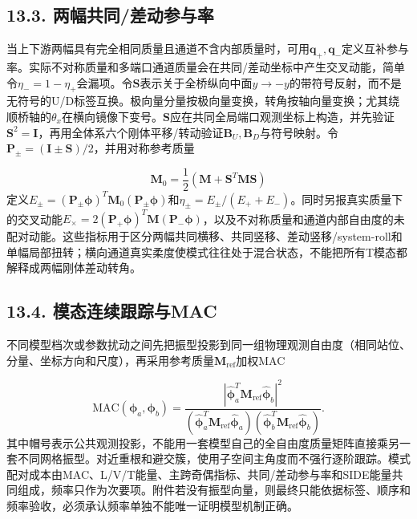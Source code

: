 \documentclass[UTF8,a4paper,11pt,fontset=none]{ctexart}
\begin{document}
\subsection*{13.3. 两幅共同/差动参与率}
当上下游两幅具有完全相同质量且通道不含内部质量时，可用\(\mathbf q_+,\allowbreak \mathbf q_-\)\allowbreak{}定义互补参与率。实际不对称质量和多端口通道质量会在共同/差动坐标中产生交叉动能，简单令\(\eta_-=1-\eta_+\)\allowbreak{}会漏项。令\(\mathbf S\)\allowbreak{}表示关于全桥纵向中面\(y\to-y\)\allowbreak{}的带符号反射，而不是无符号的U/D标签互换。极向量分量按极向量变换，转角按轴向量变换；尤其绕顺桥轴的\(\theta_x\)\allowbreak{}在横向镜像下变号。\(\mathbf S\)\allowbreak{}应在共同全局端口观测坐标上构造，并先验证\(\mathbf S^2=\mathbf I\)\allowbreak{}，再用全体系六个刚体平移/转动验证\(\mathbf B_U,\allowbreak \mathbf B_D\)\allowbreak{}与符号映射。令\(\mathbf P_\pm=(\mathbf I\pm\mathbf S)/2\)\allowbreak{}，并用对称参考质量\par
\[
\mathbf M_0=\frac12(\mathbf M+\mathbf S^T\mathbf M\mathbf S)
\]
定义\(E_\pm=(\mathbf P_\pm\boldsymbol\phi)^T\mathbf M_0(\mathbf P_\pm\boldsymbol\phi)\)\allowbreak{}和\(\eta_\pm=E_\pm/(E_++E_-)\)\allowbreak{}。同时另报真实质量下的交叉动能\(E_\times=2(\mathbf P_+\boldsymbol\phi)^T\mathbf M(\mathbf P_-\boldsymbol\phi)\)\allowbreak{}，以及不对称质量和通道内部自由度的未配对动能。这些指标用于区分两幅共同横移、共同竖移、差动竖移/system-roll和单幅局部扭转；横向通道真实柔度使模式往往处于混合状态，不能把所有T模态都解释成两幅刚体差动转角。\par
{}
\subsection*{13.4. 模态连续跟踪与MAC}
不同模型档次或参数扰动之间先把振型投影到同一组物理观测自由度（相同站位、分量、坐标方向和尺度），再采用参考质量\(\mathbf M_{\mathrm{ref}}\)\allowbreak{}加权MAC\par
\[
\mathrm{MAC}(\boldsymbol\phi_a,\boldsymbol\phi_b)=
\frac{
|\widehat{\boldsymbol\phi}_a^T\mathbf M_{\mathrm{ref}}\widehat{\boldsymbol\phi}_b|^2
}{
(\widehat{\boldsymbol\phi}_a^T\mathbf M_{\mathrm{ref}}\widehat{\boldsymbol\phi}_a)
(\widehat{\boldsymbol\phi}_b^T\mathbf M_{\mathrm{ref}}\widehat{\boldsymbol\phi}_b)
}.
\]
其中帽号表示公共观测投影，不能用一套模型自己的全自由度质量矩阵直接乘另一套不同网格振型。对近重根和避交簇，使用子空间主角度而不强行逐阶跟踪。模式配对成本由MAC、L/V/T能量、主跨奇偶指标、共同/差动参与率和SIDE能量共同组成，频率只作为次要项。附件若没有振型向量，则最终只能依据标签、顺序和频率验收，必须承认频率单独不能唯一证明模型机制正确。\par
{}
\end{document}
